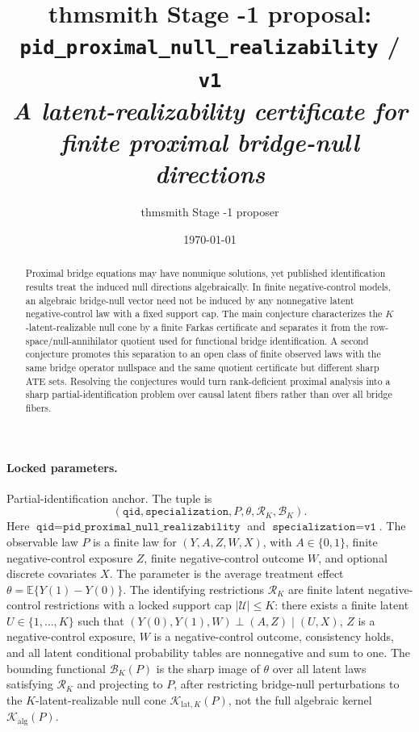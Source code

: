 \documentclass[11pt]{article}
\title{thmsmith Stage -1 proposal: \texttt{pid\_proximal\_null\_realizability} / \texttt{v1}%
  \\ \large\textit{A latent-realizability certificate for finite proximal bridge-null directions}}
\author{thmsmith Stage -1 proposer}
\date{\today}
\newcommand{\E}{\mathbb{E}}
\theoremstyle{definition}
\theoremstyle{plain}
\theoremstyle{remark}
\begin{document}
\maketitle


\paragraph{Locked parameters.}
Partial-identification anchor. The tuple is
\[
(\texttt{qid},\texttt{specialization},P,\theta,\mathcal R_K,\mathcal B_K).
\]
Here \(\texttt{qid}=\texttt{pid\_proximal\_null\_realizability}\) and \(\texttt{specialization}=\texttt{v1}\). The observable law \(P\) is a finite law for \((Y,A,Z,W,X)\), with \(A\in\{0,1\}\), finite negative-control exposure \(Z\), finite negative-control outcome \(W\), and optional discrete covariates \(X\). The parameter is the average treatment effect \(\theta=\E\{Y(1)-Y(0)\}\). The identifying restrictions \(\mathcal R_K\) are finite latent negative-control restrictions with a locked support cap \(|\mathcal U|\le K\): there exists a finite latent \(U\in\{1,\ldots,K\}\) such that \((Y(0),Y(1),W)\perp(A,Z)\mid(U,X)\), \(Z\) is a negative-control exposure, \(W\) is a negative-control outcome, consistency holds, and all latent conditional probability tables are nonnegative and sum to one. The bounding functional \(\mathcal B_K(P)\) is the sharp image of \(\theta\) over all latent laws satisfying \(\mathcal R_K\) and projecting to \(P\), after restricting bridge-null perturbations to the \(K\)-latent-realizable null cone \(\mathcal K_{\mathrm{lat},K}(P)\), not the full algebraic kernel \(\mathcal K_{\mathrm{alg}}(P)\).

\begin{abstract}
Proximal bridge equations may have nonunique solutions, yet published identification results treat the induced null directions algebraically. In finite negative-control models, an algebraic bridge-null vector need not be induced by any nonnegative latent negative-control law with a fixed support cap. The main conjecture characterizes the \(K\)-latent-realizable null cone by a finite Farkas certificate and separates it from the row-space/null-annihilator quotient used for functional bridge identification. A second conjecture promotes this separation to an open class of finite observed laws with the same bridge operator nullspace and the same quotient certificate but different sharp ATE sets. Resolving the conjectures would turn rank-deficient proximal analysis into a sharp partial-identification problem over causal latent fibers rather than over all bridge fibers.
\end{abstract}
\end{document}
